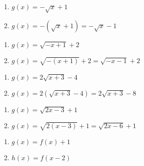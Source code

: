 \begin{multicols}{2}
\begin{enumerate}
\setcounter{enumi}{\value{HW}}

\item  $g(x) = -\sqrt{x} + 1$
\item  $g(x) = -(\sqrt{x} + 1) = -\sqrt{x} - 1$

\setcounter{HW}{\value{enumi}}
\end{enumerate}
\end{multicols}

\begin{multicols}{2}
\begin{enumerate}
\setcounter{enumi}{\value{HW}}

\item  $g(x) = \sqrt{-x+1} + 2$
\item  $g(x) = \sqrt{-(x+1)} + 2 = \sqrt{-x-1} + 2$

\setcounter{HW}{\value{enumi}}
\end{enumerate}
\end{multicols}

\begin{multicols}{2}
\begin{enumerate}
\setcounter{enumi}{\value{HW}}

\item  $g(x) = 2\sqrt{x+3} - 4$
\item  $g(x) = 2\left(\sqrt{x+3} - 4\right) = 2\sqrt{x+3} - 8$

\setcounter{HW}{\value{enumi}}
\end{enumerate}
\end{multicols}

\begin{multicols}{2}
\begin{enumerate}
\setcounter{enumi}{\value{HW}}

\item  $g(x) = \sqrt{2x-3} + 1$
\item  $g(x) = \sqrt{2(x-3)} + 1 = \sqrt{2x-6}+1$

\setcounter{HW}{\value{enumi}}
\end{enumerate}
\end{multicols}

\begin{multicols}{2}
\begin{enumerate}
\setcounter{enumi}{\value{HW}}

\item  $g(x)=f(x)+1$ 

\item  $h(x) = f(x-2)$ 


\setcounter{HW}{\value{enumi}}
\end{enumerate}
\end{multicols}



